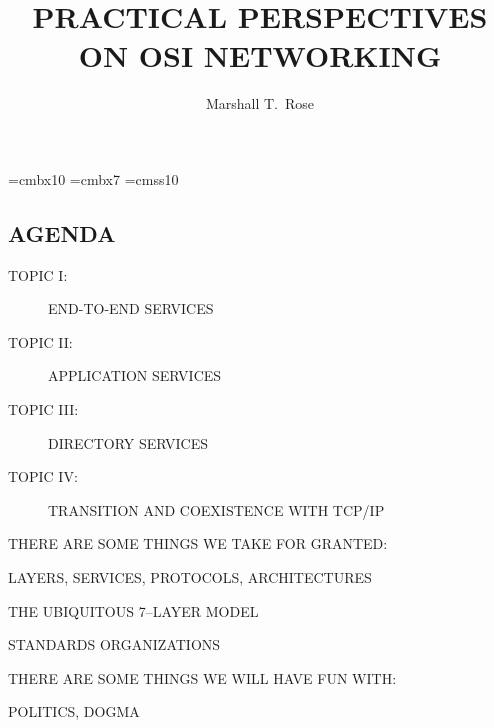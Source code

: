 

\def\emph#1{\underline{#1}}
\def\X/{$\surd$}

\font\xx=cmbx10
\font\yy=cmbx7
\font\sf=cmss10

\raggedright


\let\tradeNAMfont=\relax
\let\tradeORGfont=\relax





\title	{PRACTICAL PERSPECTIVES\\ ON OSI NETWORKING}
\author	{Marshall T.~Rose}
\date	{}
\maketitlepage


\begin{bwslide}\thispagestyle{empty}
\part*	{AGENDA}\bf

\begin{description}
\item[TOPIC I:]		END-TO-END SERVICES

\item[TOPIC II:]	APPLICATION SERVICES

\item[TOPIC III:]	DIRECTORY SERVICES

\item[TOPIC IV:]	TRANSITION AND COEXISTENCE WITH TCP/IP
\end{description}
\end{bwslide}

\setcounter{slide}{0}

\begin{bwslide}

\begin{nrtc}
\item	THERE ARE SOME THINGS WE TAKE FOR GRANTED:
    \begin{nrtc}
    \item	LAYERS, SERVICES, PROTOCOLS, ARCHITECTURES

    \item	THE UBIQUITOUS 7--LAYER MODEL

    \item	STANDARDS ORGANIZATIONS
    \end{nrtc}

\item	THERE ARE SOME THINGS WE WILL HAVE FUN WITH:
    \begin{nrtc}
    \item	POLITICS, DOGMA
    \end{nrtc}
\end{nrtc}
\end{bwslide}












